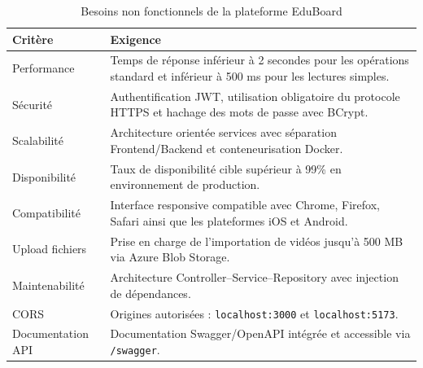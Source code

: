 
\begin{table}[H]
\centering
\caption{Besoins non fonctionnels de la plateforme EduBoard}
\label{tab:bnf}

\renewcommand{\arraystretch}{1.2}

\begin{tabularx}{\textwidth}{|p{3.5cm}|X|}
\hline
\textbf{Critère} & \textbf{Exigence} \\
\hline

Performance &
Temps de réponse inférieur à 2 secondes pour les opérations standard et inférieur à 500 ms pour les lectures simples. \\
\hline

Sécurité &
Authentification JWT, utilisation obligatoire du protocole HTTPS et hachage des mots de passe avec BCrypt. \\
\hline

Scalabilité &
Architecture orientée services avec séparation Frontend/Backend et conteneurisation Docker. \\
\hline

Disponibilité &
Taux de disponibilité cible supérieur à 99\% en environnement de production. \\
\hline

Compatibilité &
Interface responsive compatible avec Chrome, Firefox, Safari ainsi que les plateformes iOS et Android. \\
\hline

Upload fichiers &
Prise en charge de l'importation de vidéos jusqu'à 500 MB via Azure Blob Storage. \\
\hline

Maintenabilité &
Architecture Controller--Service--Repository avec injection de dépendances. \\
\hline

\ac{CORS} &
Origines autorisées : \texttt{localhost:3000} et \texttt{localhost:5173}. \\
\hline

Documentation \ac{API} &
Documentation Swagger/OpenAPI intégrée et accessible via \texttt{/swagger}. \\
\hline

\end{tabularx}
\end{table}



